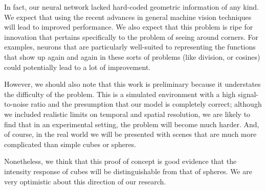 \documentclass[11pt]{article}
\begin{document}
In fact, our neural network lacked hard-coded geometric information of any kind. We expect that using the recent advances in general machine vision techniques will lead to improved performance. We also expect that this problem is ripe for innovation that pertains specifically to the problem of seeing around corners. For examples, neurons that are particularly well-suited to representing the functions that show up again and again in these sorts of problems (like division, or cosines) could potentially lead to a lot of improvement.

However, we should also note that this work is preliminary because it understates the difficulty of the problem. This is a simulated environment with a high signal-to-noise ratio and the presumption that our model is completely correct; although we included realistic limits on temporal and spatial resolution, we are likely to find that in an experimental setting, the problem will become much harder. And, of course, in the real world we will be presented with scenes that are much more complicated than simple cubes or spheres.

Nonetheless, we think that this proof of concept is good evidence that the intensity response of cubes will be distinguishable from that of spheres. We are very optimistic about this direction of our research.
\end{document}
